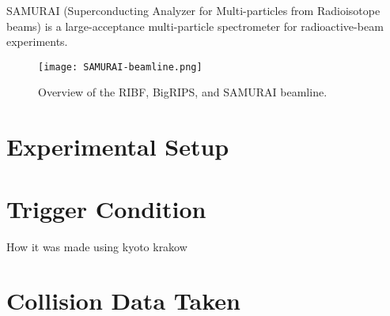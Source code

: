 SAMURAI (Superconducting Analyzer for Multi-particles from Radioisotope beams) is a large-acceptance multi-particle spectrometer for radioactive-beam experiments.
\begin{figure}[H]
\texttt{[image: SAMURAI-beamline.png]}
\caption{Overview of the RIBF, BigRIPS, and SAMURAI beamline.}
\label{fig:sambl}
\end{figure}

\section{Experimental Setup}

\section{Trigger Condition}
How it was made using kyoto krakow

\section{Collision Data Taken}

